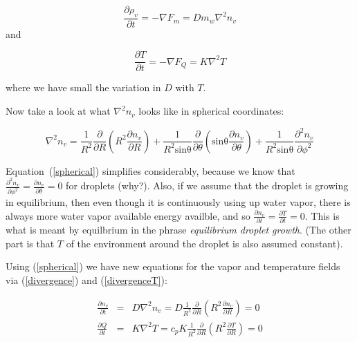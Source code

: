 \documentclass[12pt]{article}
\begin{document}
\begin{equation}
  \label{divergence}
  \frac{\partial \rho_v}{\partial t} = - \nabla F_m = D m_w \nabla^2 n_v
\end{equation}
and

\begin{equation}
  \label{divergenceT}
  \frac{\partial T}{\partial t} = - \nabla F_Q = K \nabla^2 T
\end{equation}


\noindent
where we have small the variation in $D$ with $T$.

Now take a look at what $\nabla^2 n_v$ looks like in spherical
coordinates:

\begin{equation}
  \label{spherical}
  \nabla^2 n_v = \frac{1}{R^2} \frac{\partial}{\partial R} \left ( 
               R^2 \frac{\partial n_v}{\partial R} \right )
             + \frac{1}{R^2 \mathrm{sin \theta}}
             \frac{\partial}{\partial \theta} 
              \left (\mathrm{sin \theta} \frac{\partial n_v}{\partial \theta} \right )
             + \frac{1}{R^2 \mathrm{sin \theta}}
             \frac{\partial^2 n_v}{\partial \phi^2} 
\end{equation}

Equation~(\ref{spherical}) simplifies considerably, because we know
that $\frac{\partial^2 n_v}{\partial \phi^2}=\frac{\partial
  n_v}{\partial \theta}=0$ for droplets (why?).  Also, if we assume
that the droplet is growing in equilibrium, then even though it is
continuously using up water vapor, there is always more water vapor
available energy availble, and so 
$\frac{\partial n_v}{\partial t} = \frac{\partial T}{\partial t} =0$. This is 
what is meant by equilbrium in the phrase \textit{equilibrium droplet growth}.
(The other part is that $T$ of the environment around the droplet is
also assumed constant).

Using (\ref{spherical}) we have new equations for the vapor and
temperature fields via (\ref{divergence}) and (\ref{divergenceT}):

\begin{eqnarray}
  \label{duel}
  \frac{\partial n_v}{\partial t}& = & D \nabla^2 n_v = D \frac{1}{R^2}
               \frac{\partial}{\partial R} \left ( R^2 \frac{\partial
               n_v}{\partial R} \right ) = 0 \nonumber \\
  \frac{\partial Q}{\partial t}& = &  K \nabla^2 T = c_p K \frac{1}{R^2}
               \frac{\partial}{\partial R} \left ( R^2 \frac{\partial
               T}{\partial R} \right ) = 0
\end{eqnarray}
\end{document}
